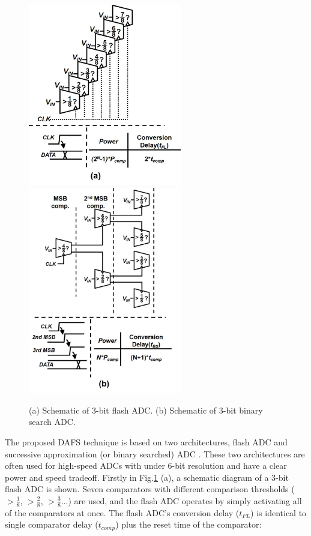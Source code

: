 \begin{figure}
\centering
  \includegraphics[width=0.6\textwidth]{figure/chap3/fig2a.jpg}
  \includegraphics[width=0.6\textwidth]{figure/chap3/fig2b.jpg}
  \caption{ (a) Schematic of 3-bit flash ADC. (b) Schematic of 3-bit binary search ADC.}
  \label{fig-3-2}
\end{figure}

The proposed DAFS technique is based on two architectures, flash ADC and successive approximation (or binary searched) ADC \cite{van2008150}.
These two architectures are often used for high-speed ADCs with under 6-bit resolution and have a clear power and speed tradeoff. Firstly in Fig.\ref{fig-3-2} (a), a schematic diagram of a 3-bit flash ADC is shown. Seven comparators with different comparison thresholds ($>\frac{1}{8}$, $>\frac{2}{8}$, $>\frac{3}{8}$...) are used, and the flash ADC operates by simply activating all of the comparators at once. The flash ADC’s conversion delay ($t_{FL}$) is identical to single comparator delay ($t_{comp}$) plus the reset time of the comparator:

